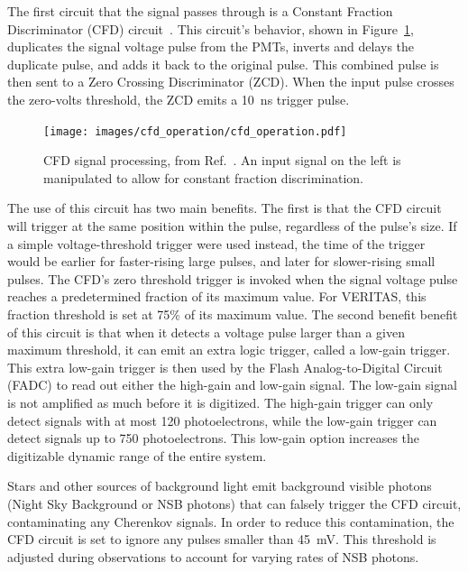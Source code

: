 The first circuit that the signal passes through is a Constant Fraction Discriminator (CFD) circuit~\cite{cfd_behavior}.
This circuit's behavior, shown in Figure~\ref{fig:cfd_operation}, duplicates the signal voltage pulse from the PMTs, inverts and delays the duplicate pulse, and adds it back to the original pulse.
This combined pulse is then sent to a Zero Crossing Discriminator (ZCD).
When the input pulse crosses the zero-volts threshold, the ZCD emits a \SI{10}{ns} trigger pulse.

\begin{figure}[ht]
  \centering
  \texttt{[image: images/cfd\_operation/cfd\_operation.pdf]}
  \caption[CFD Operation]{
    CFD signal processing, from Ref.~\cite{cfd_operation}.
    An input signal on the left is manipulated to allow for constant fraction discrimination.
  }
  \label{fig:cfd_operation}
\end{figure}

The use of this circuit has two main benefits.
The first is that the CFD circuit will trigger at the same position within the pulse, regardless of the pulse's size.
If a simple voltage-threshold trigger were used instead, the time of the trigger would be earlier for faster-rising large pulses, and later for slower-rising small pulses.
The CFD's zero threshold trigger is invoked when the signal voltage pulse reaches a predetermined fraction of its maximum value.
For VERITAS, this fraction threshold is set at 75\% of its maximum value.
The second benefit benefit of this circuit is that when it detects a voltage pulse larger than a given maximum threshold, it can emit an extra logic trigger, called a low-gain trigger.
This extra low-gain trigger is then used by the Flash Analog-to-Digital Circuit (FADC) to read out either the high-gain and low-gain signal.
The low-gain signal is not amplified as much before it is digitized.
The high-gain trigger can only detect signals with at most 120 photoelectrons, while the low-gain trigger can detect signals up to 750 photoelectrons.
This low-gain option increases the digitizable dynamic range of the entire system.

Stars and other sources of background light emit background visible photons (Night Sky Background or NSB photons) that can falsely trigger the CFD circuit, contaminating any Cherenkov signals.
In order to reduce this contamination, the CFD circuit is set to ignore any pulses smaller than \SI{45}{mV}.
This threshold is adjusted during observations to account for varying rates of NSB photons.

